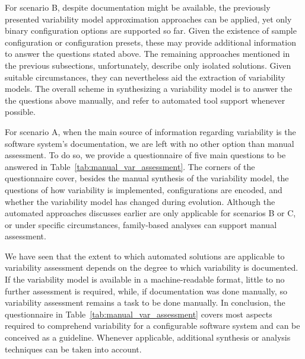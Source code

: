 For scenario B, despite documentation might be available, the
previously presented variability model approximation approaches
\citep{haslinger_reverse_2011,haslinger_extracting_2013,lopez-herrejon_reverse_2012,linsbauer_feature_2014}
can be applied, yet only binary configuration options are supported so far.
Given the existence of sample configuration or configuration presets, these
may provide additional information to answer the questions stated above. 
The remaining approaches mentioned in the previous subsections, unfortunately,
describe only isolated solutions. Given suitable circumstances, they can
nevertheless aid the extraction of variability models. The overall scheme in
synthesizing a variability model is to answer the the questions above manually,
and refer to automated tool support whenever possible.

For scenario A, when the main source of information regarding variability is
the software system's documentation, we are left with no other option than manual
assessment. To do so, we provide a questionnaire of
five main questions to be answered in Table~\ref{tab:manual_var_assessment}.
The corners of the questionnaire cover, besides the manual synthesis of the
variability model, the questions of how variability is implemented,
configurations are encoded, and whether the variability model has changed
during evolution. Although the automated approaches discusses earlier are only
applicable for scenarios B or C, or under specific circumstances, family-based
analyses can support manual assessment.

We have seen that the extent to which automated solutions are applicable to
variability assessment depends on the degree to which variability is
documented. If the variability model is available  in a machine-readable
format, little to no further assessment is required, while, if documentation was
done manually, so variability assessment remains a task to be done manually. 
In conclusion, the questionnaire in Table~\ref{tab:manual_var_assessment} covers
most aspects required to comprehend variability for a configurable software system and can be
conceived as a guideline. Whenever applicable, additional synthesis or analysis
techniques can be taken into account.

